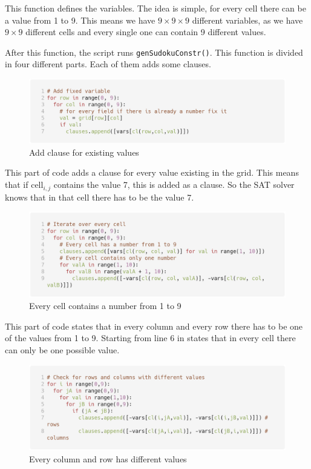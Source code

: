 \documentclass[10pt]{article}
\begin{document}
This function defines the variables. The idea is simple, for every
cell there can be a value from 1 to 9. This means we have \(9 \times 9 \times 9 \) different
variables, as we have \(9 \times 9 \) different cells and every single one
can contain 9 different values.
\par\vspace{0.5cm}

After this function, the script runs \texttt{genSudokuConstr()}.
This function is divided in four different parts. Each of them
adds some clauses.

\begin{figure}[H]
  \centering
  \includegraphics[width=\textwidth]{clause_01.png}
  \caption{Add clause for existing values}
\end{figure}

This part of code adds a clause for every value existing
in the grid. This means that if cell\(_{i,j}\) contains the value
7, this is added as a clause. So the SAT solver knows that in
that cell there has to be the value 7.

\begin{figure}[H]
  \centering
  \includegraphics[width=\textwidth]{clause_02.png}
  \caption{Every cell contains a number from 1 to 9}
\end{figure}

This part of code states that in every column and every row there has to be one of the values
from 1 to 9. Starting from line 6 in states that in every
cell there can only be one possible value.

\begin{figure}[H]
  \centering
  \includegraphics[width=\textwidth]{clause_03.png}
  \caption{Every column and row has different values}
\end{figure}
\end{document}
